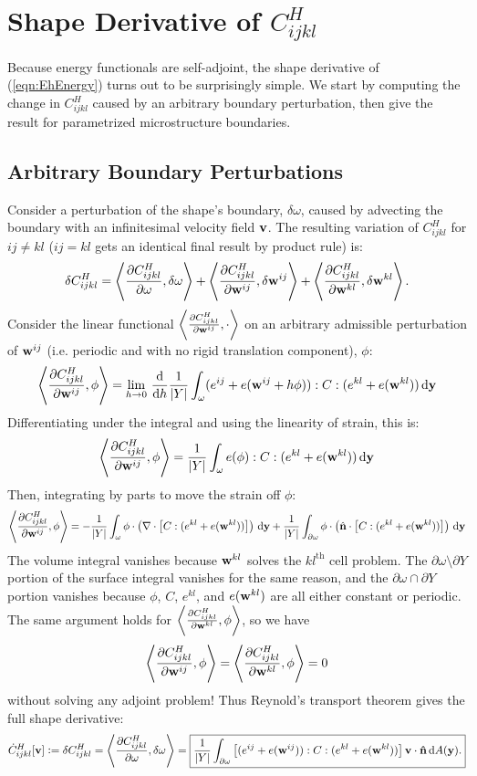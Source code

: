 \documentclass[10pt]{article}
\providecommand{\dA}{\, \mathrm{d}A}
\providecommand{\pder}[2]{\frac{\partial #1}{\partial #2}}
\providecommand{\tder}[2]{\frac{\mathrm{d} #1}{\mathrm{d} #2}}
\newcommand{\defeq}{\vcentcolon=}
\begin{document}
\section{Shape Derivative of $C^H_{ijkl}$}
Because energy functionals are self-adjoint, the shape derivative of
(\ref{eqn:EhEnergy}) turns out to be surprisingly simple. We start by computing
the change in $C^H_{ijkl}$ caused by an arbitrary boundary perturbation, then
give the result for parametrized microstructure boundaries.

\subsection{Arbitrary Boundary Perturbations}
Consider a perturbation of the shape's boundary, $\delta\omega$, caused by
advecting the boundary with an infinitesimal velocity field ${\bf v}$. The
resulting variation of $C^H_{ijkl}$ for $ij \ne kl$ ($ij = kl$ gets an
identical final result by product rule) is:
$$
\delta C^H_{ijkl} = \left<\pder{C^H_{ijkl}}{\omega}, \delta \omega\right>
    + \left<\pder{C^H_{ijkl}}{{\bf w}^{ij}}, \delta {\bf w}^{ij}\right>
    + \left<\pder{C^H_{ijkl}}{{\bf w}^{kl}}, \delta {\bf w}^{kl}\right>.
$$
Consider the linear functional
$\left<\pder{C^H_{ijkl}}{{\bf w}^{ij}}, \cdot \right>$  on an arbitrary
admissible perturbation of ${\bf w}^{ij}$ (i.e. periodic and with no rigid
translation component), $\phi$:
$$
\left<\pder{C^H_{ijkl}}{{\bf w}^{ij}}, \phi\right> =
\lim_{h \to 0} \, \tder{}{h} \frac{1}{|Y|} \int_\omega (e^{ij} + e({\bf w}^{ij} + h \phi)) : C : (e^{kl} + e({\bf w}^{kl})) \, \mathrm{d} {\bf y}
$$
Differentiating under the integral and using the linearity of strain, this is:
$$
\left<\pder{C^H_{ijkl}}{{\bf w}^{ij}}, \phi\right> =
\frac{1}{|Y|} \int_\omega e(\phi) : C : (e^{kl} + e({\bf w}^{kl})) \, \mathrm{d} {\bf y}
$$
Then, integrating by parts to move the strain off $\phi$:
$$
\left<\pder{C^H_{ijkl}}{{\bf w}^{ij}}, \phi\right> =
-\frac{1}{|Y|} \int_\omega \phi \cdot \left(\nabla \cdot \left[C : (e^{kl} + e({\bf w}^{kl}))\right]\right) \, \mathrm{d} {\bf y}
+ \frac{1}{|Y|} \int_{\partial \omega} \phi \cdot \left(\hat{{\bf n}} \cdot \left[C : (e^{kl} + e({\bf w}^{kl}))\right]\right) \, \mathrm{d} {\bf y}
$$
The volume integral vanishes because ${\bf w}^{kl}$ solves the $kl^\text{th}$
cell problem. The $\partial \omega \setminus \partial Y$ portion of the surface
integral vanishes for the same reason, and the $\partial \omega \cap \partial
Y$ portion vanishes because $\phi$, $C$, $e^{kl}$, and $e({\bf w}^{kl})$ are all
either constant or periodic. The same argument holds for
$\left<\pder{C^H_{ijkl}}{{\bf w}^{kl}}, \phi\right>$, so we have
$$
\left<\pder{C^H_{ijkl}}{{\bf w}^{ij}}, \phi\right> =
\left<\pder{C^H_{ijkl}}{{\bf w}^{kl}}, \phi\right> = 0
$$
without solving any adjoint problem!
Thus Reynold's transport theorem gives the full shape derivative:
$$
\dot{C}^H_{ijkl}[{\bf v}] \defeq
\delta C^H_{ijkl} = \left<\pder{C^H_{ijkl}}{\omega}, \delta \omega\right> =
\boxed{
\frac{1}{|Y|} \int_{\partial \omega} \left[(e^{ij} + e({\bf w}^{ij})) : C : (e^{kl} + e({\bf w}^{kl}))\right] {\bf v} \cdot {\bf \hat{n}} \dA({\bf y}).}
$$
\end{document}
